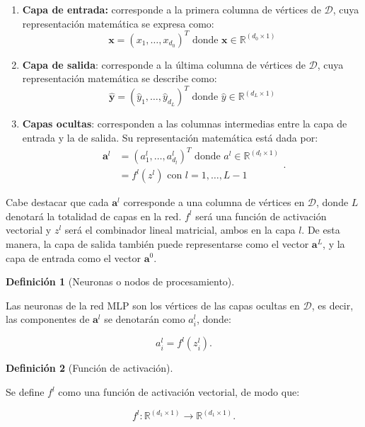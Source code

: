 \documentclass[
  us-letterpaper,
]{scrreprt}
\theoremstyle{plain}
\theoremstyle{definition}
\theoremstyle{plain}
\theoremstyle{definition}
\newtheorem{definition}{Definición}[chapter]
\theoremstyle{remark}
\begin{document}
\begin{enumerate}
\def\labelenumi{\arabic{enumi}.}
\item
  \textbf{Capa de entrada:} corresponde a la primera columna de vértices
  de \(\mathscr D\), cuya representación matemática se expresa como:
  \[\mathbf x = (x_1, \ldots, x_{d_0})^T \text{ donde } \mathbf x \in \mathbb{R}^{(d_0 \times 1)}\]
\item
  \textbf{Capa de salida}: corresponde a la última columna de vértices
  de \(\mathscr D\), cuya representación matemática se describe como:
  \[\hat{\mathbf y} = (\hat{y}_1, \ldots, \hat{y}_{d_L})^T \text{ donde } \hat{y}\in\mathbb{R}^{(d_L\times 1)}\]
\item
  \textbf{Capas ocultas}: corresponden a las columnas intermedias entre
  la capa de entrada y la de salida. Su representación matemática está
  dada por: \[\begin{split}
  \mathbf a^l &= (a_{1}^l, \ldots, a_{d_l}^l)^T \text{ donde } a^l\in\mathbb{R}^{(d_l\times 1)}\\ &= f^l(z^l)\text{ con } l = 1, \ldots, L - 1
  \end{split}.\]
\end{enumerate}

Cabe destacar que cada \(\mathbf a^l\) corresponde a una columna de
vértices en \(\mathscr D\), donde \(L\) denotará la totalidad de capas
en la red. \(f^l\) será una función de activación vectorial y \(z^l\)
será el combinador lineal matricial, ambos en la capa \(l\). De esta
manera, la capa de salida también puede representarse como el vector
\(\mathbf a^L\), y la capa de entrada como el vector \(\mathbf a^0\).

\begin{definition}[Neuronas o nodos de
procesamiento]\protect\hypertarget{def-nodos}{}\label{def-nodos}

Las neuronas de la red MLP son los vértices de las capas ocultas en
\(\mathscr D\), es decir, las componentes de \(\mathbf a^l\) se
denotarán como \(a_i^l\), donde:

\[
a_i^l=f^l(z_i^l).
\]

\end{definition}

\begin{definition}[Función de
activación]\protect\hypertarget{def-funac}{}\label{def-funac}

Se define \(f^l\) como una función de activación vectorial, de modo que:

\[
f^l: \mathbb R^{(d_1\times 1)}\rightarrow \mathbb R^{(d_1\times 1)}.
\]

\end{definition}
\end{document}
